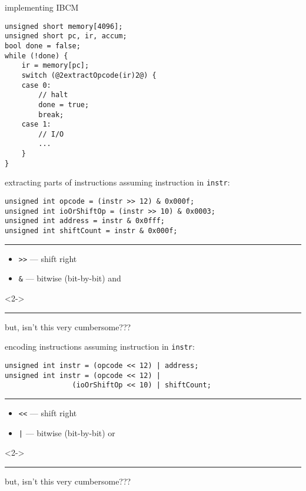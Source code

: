 \begin{frame}[fragile,label=implOutline]{implementing IBCM}
\begin{lstlisting}
unsigned short memory[4096];
unsigned short pc, ir, accum;
bool done = false;
while (!done) {
    ir = memory[pc];
    switch (@2extractOpcode(ir)2@) {
    case 0:
        // halt
        done = true;
        break;
    case 1:
        // I/O
        ...
    }
}
\end{lstlisting}
\end{frame}

\begin{frame}[fragile,label=extractOp]{extracting parts of instructions}
assuming instruction in \texttt{instr}:
\begin{lstlisting}
unsigned int opcode = (instr >> 12) & 0x000f;
unsigned int ioOrShiftOp = (instr >> 10) & 0x0003;
unsigned int address = instr & 0x0fff;
unsigned int shiftCount = instr & 0x000f;
\end{lstlisting}
\hrule
\begin{itemize}
\item \lstinline|>>| --- shift right
\item \lstinline|&| --- bitwise (bit-by-bit) and
\end{itemize}
\begin{visibleenv}<2->
\hrule
but, isn't this very cumbersome???
\end{visibleenv}
\end{frame}

\begin{frame}[fragile,label=encodeOp]{encoding instructions}
assuming instruction in \texttt{instr}:
\begin{lstlisting}
unsigned int instr = (opcode << 12) | address;
unsigned int instr = (opcode << 12) |
                (ioOrShiftOp << 10) | shiftCount;
\end{lstlisting}
\hrule
\begin{itemize}
\item \lstinline|<<| --- shift right
\item \lstinline^|^ --- bitwise (bit-by-bit) or
\end{itemize}
\begin{visibleenv}<2->
\hrule
but, isn't this very cumbersome???
\end{visibleenv}
\end{frame}

